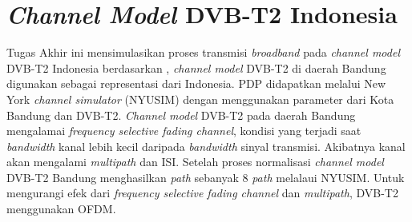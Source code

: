 \section{\textit{Channel Model} DVB-T2 Indonesia }
Tugas Akhir ini mensimulasikan proses transmisi \textit{broadband} pada \textit{channel model} DVB-T2 Indonesia berdasarkan \cite{pdpband}, \textit{channel model} DVB-T2 di daerah Bandung digunakan sebagai representasi dari Indonesia.  PDP didapatkan melalui New York \textit{channel simulator} (NYUSIM) dengan menggunakan parameter dari Kota Bandung dan DVB-T2. \textit{Channel model} DVB-T2 pada daerah Bandung mengalamai \textit{frequency selective fading channel}, kondisi yang terjadi saat \textit{bandwidth} kanal lebih kecil daripada \textit{bandwidth} sinyal transmisi. Akibatnya kanal akan mengalami \textit{multipath} dan ISI. Setelah proses normalisasi \textit{channel model} DVB-T2 Bandung menghasilkan \textit{path} sebanyak 8 \textit{path} melalaui NYUSIM. Untuk mengurangi efek dari \textit{frequency selective fading channel} dan \textit{multipath}, DVB-T2 menggunakan OFDM.


